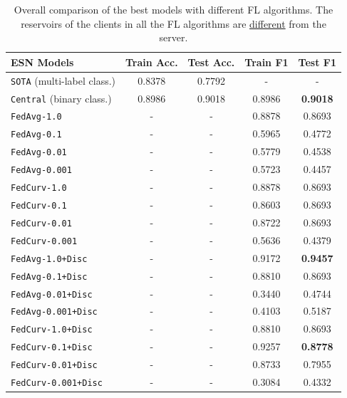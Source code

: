 {{{{{\renewcommand{\arraystretch}{1.0}
\begin{table}[H]
    \centering
    \begin{tabular}{|l|c|c|c|c|}
        \hline
        ESN Models & Train Acc. & Test Acc. & Train F1 & Test F1 \\ \hline\hline
        
        \texttt{SOTA} (multi-label class.) & 0.8378 & 0.7792 & - & - \\ \hline
        \texttt{Central} (binary class.) & 0.8986 & 0.9018 & 0.8986 & \textbf{0.9018} \\ \hline
        \texttt{FedAvg-1.0} & - & - & 0.8878 & 0.8693 \\ \hline
        \texttt{FedAvg-0.1} & - & - & 0.5965 & 0.4772 \\ \hline
        \texttt{FedAvg-0.01} & - & - & 0.5779 & 0.4538 \\ \hline
        \texttt{FedAvg-0.001} & - & - & 0.5723 & 0.4457 \\ \hline
        \texttt{FedCurv-1.0} & - & - & 0.8878 & 0.8693 \\ \hline
        \texttt{FedCurv-0.1} & - & - & 0.8603 & 0.8693 \\ \hline
        \texttt{FedCurv-0.01} & - & - & 0.8722 & 0.8693 \\ \hline
        \texttt{FedCurv-0.001} & - & - & 0.5636 & 0.4379 \\ \hline
        \texttt{FedAvg-1.0+Disc} & - & - & 0.9172 & \textbf{0.9457} \\ \hline
        \texttt{FedAvg-0.1+Disc} & - & - & 0.8810 & 0.8693 \\ \hline
        \texttt{FedAvg-0.01+Disc} & - & - & 0.3440 & 0.4744 \\ \hline
        \texttt{FedAvg-0.001+Disc} & - & - & 0.4103 & 0.5187 \\ \hline
        \texttt{FedCurv-1.0+Disc} & - & - & 0.8810 & 0.8693 \\ \hline
        \texttt{FedCurv-0.1+Disc} & - & - & 0.9257 & \textbf{0.8778} \\ \hline
        \texttt{FedCurv-0.01+Disc} & - & - & 0.8733 & 0.7955 \\ \hline
        \texttt{FedCurv-0.001+Disc} & - & - & 0.3084 & 0.4332 \\ \hline
    \end{tabular}
    \caption{Overall comparison of the best models with different FL algorithms. The reservoirs of the clients in all the FL algorithms are \underline{different} from the server.}
    \label{tab:final_comp_diff}
\end{table}

}}}}}
